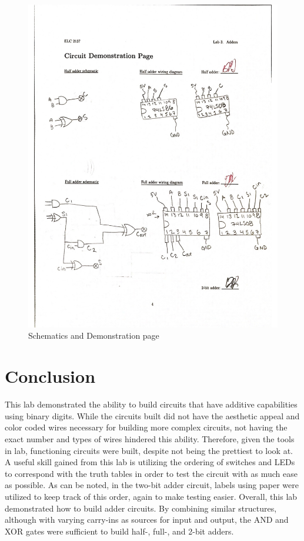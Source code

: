 \documentclass[11pt]{article}
\begin{document}
\begin{figure}
	\includegraphics[width=1.0\textwidth]{"Circuit D"}
	\caption{Schematics and Demonstration page}
\end{figure}


\clearpage

\section*{Conclusion}

This lab demonstrated the ability to build circuits that have additive capabilities using binary digits. While the circuits built did not have the aesthetic appeal and color coded wires necessary for building more complex circuits, not having the exact number and types of wires hindered this ability. Therefore, given the tools in lab, functioning circuits were built, despite not being the prettiest to look at. A useful skill gained from this lab is utilizing the ordering of switches and LEDs to correspond with the truth tables in order to test the circuit with as much ease as possible. As can be noted, in the two-bit adder circuit, labels using paper were utilized to keep track of this order, again to make testing easier. Overall, this lab demonstrated how to build adder circuits. By combining similar structures, although with varying carry-ins as sources for input and output, the AND and XOR gates were sufficient to build half-, full-, and 2-bit adders.
\end{document}
